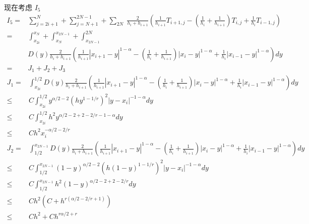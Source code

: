 \documentclass{ctexart}
\theoremstyle{definition}
\theoremstyle{remark}
\numberwithin{equation}{section}
\begin{document}
现在考虑 \(I_5\)
\begin{equation}
    \begin{aligned}
        I_5 = & \sum_{j=2i+1}^{N} + \sum_{j=N+1}^{2N-1} + \sum_{2N} \; \frac{2}{h_i + h_{i+1}}
        \left( \frac{1}{h_{i+1}} T_{i+1, j} - (\frac{1}{h_{i}}+\frac{1}{h_{i+1}}) T_{i,j} + \frac{1}{h_{i}} T_{i-1, j} \right) \\
        =     & \int_{x_{2i}}^{x_{N}} +\int_{x_{N}}^{x_{2N-1}} + \int_{x_{2N-1}}^{2N}                                          \\
              & D(y) \frac{2}{h_i + h_{i+1}}
        ( \frac{1}{h_{i+1}} |x_{i+1}-y|^{1-\alpha}
        - (\frac{1}{h_{i}}+\frac{1}{h_{i+1}}) |x_{i}-y|^{1-\alpha}
        +  \frac{1}{h_{i}}|x_{i-1}-y|^{1-\alpha} )  dy                                                                         \\
        =     & J_1 + J_2 + J_3
    \end{aligned}
\end{equation}
\begin{equation}
    \begin{aligned}
        J_1 = & \int_{x_{2i}}^{1/2}
        D(y) \frac{2}{h_i + h_{i+1}}
        ( \frac{1}{h_{i+1}} |x_{i+1}-y|^{1-\alpha}
        - (\frac{1}{h_{i}}+\frac{1}{h_{i+1}}) |x_{i}-y|^{1-\alpha}
        +  \frac{1}{h_{i}}|x_{i-1}-y|^{1-\alpha} )  dy                                     \\
        \le   & C \int_{x_{2i}}^{1/2} y^{\alpha/2-2} (hy^{1-1/r})^2 |y-x_i|^{-1-\alpha} dy \\
        \le   & C \int_{x_{2i}}^{1/2} h^2 y^{\alpha/2-2 + 2-2/r -1-\alpha} dy              \\
        \le   & C h^2 x_i^{-\alpha/2-2/r}
    \end{aligned}
\end{equation}
\begin{equation}
    \begin{aligned}
        J_2 = & \int_{1/2}^{x_{2N-1}}
        D(y) \frac{2}{h_i + h_{i+1}}
        ( \frac{1}{h_{i+1}} |x_{i+1}-y|^{1-\alpha}
        - (\frac{1}{h_{i}}+\frac{1}{h_{i+1}}) |x_{i}-y|^{1-\alpha}
        +  \frac{1}{h_{i}}|x_{i-1}-y|^{1-\alpha} )  dy                                               \\
        \le   & C \int_{1/2}^{x_{2N-1}} (1-y)^{\alpha/2-2} (h(1-y)^{1-1/r})^2 |y-x_i|^{-1-\alpha} dy \\
        \le   & C \int_{1/2}^{x_{2N-1}} h^2 (1-y)^{\alpha/2-2 + 2-2/r} dy                            \\
        \le   & C h^2 (C + h^{r(\alpha/2-2/r+1)})                                                    \\
        \le   & Ch^2 + C h^{r\alpha/2+r}
    \end{aligned}
\end{equation}
\end{document}
